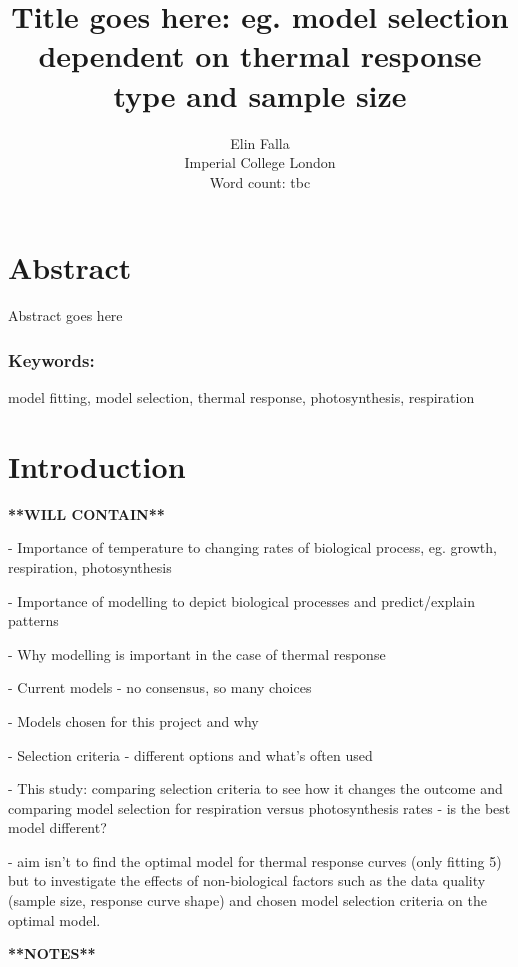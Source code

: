 \documentclass[11pt]{article}
\begin{document}
\title{Title goes here: eg. model selection dependent on thermal response type and sample size}
\author{Elin Falla\\Imperial College London
\\ Word count: tbc}
\date{}
\maketitle
\pagebreak

\section*{Abstract}
Abstract goes here
\subsubsection*{Keywords:}
model fitting, model selection, thermal response, photosynthesis, respiration
\\

\hrulefill

\section{Introduction}

\textbf{**WILL CONTAIN**}

- Importance of temperature to changing rates of biological process, eg. growth, respiration, photosynthesis

- Importance of modelling to depict biological processes and predict/explain patterns

- Why modelling is important in the case of thermal response

- Current models - no consensus, so many choices

- Models chosen for this project and why

- Selection criteria - different options and what's often used

- This study: comparing selection criteria to see how it changes the outcome and comparing model selection for respiration versus photosynthesis rates - is the best model different?

- aim isn't to find the optimal model for thermal response curves (only fitting 5) but to investigate the effects of non-biological factors such as the data quality (sample size, response curve shape) and chosen model selection criteria on the optimal model. 

\textbf{**NOTES**}
\end{document}
